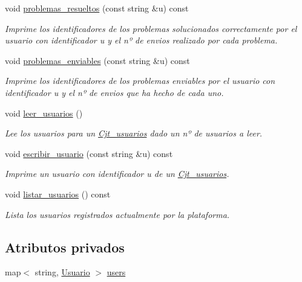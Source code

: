 \begin{DoxyCompactItemize}
void \mbox{\hyperlink{class_cjt__usuarios_a08ce8035512646dec31f4959dc8aa891}{problemas\+\_\+resueltos}} (const string \&u) const
\begin{DoxyCompactList}\small\item\em Imprime los identificadores de los problemas solucionados correctamente por el usuario con identificador u y el nº de envios realizado por cada problema. \end{DoxyCompactList}\item 
void \mbox{\hyperlink{class_cjt__usuarios_a60b4396cdd65a2aa4b7a8706dabbe08b}{problemas\+\_\+enviables}} (const string \&u) const
\begin{DoxyCompactList}\small\item\em Imprime los identificadores de los problemas enviables por el usuario con identificador u y el nº de envios que ha hecho de cada uno. \end{DoxyCompactList}\item 
void \mbox{\hyperlink{class_cjt__usuarios_aeb27ae7d46e9b78e2d477df74461bc68}{leer\+\_\+usuarios}} ()
\begin{DoxyCompactList}\small\item\em Lee los usuarios para un \mbox{\hyperlink{class_cjt__usuarios}{Cjt\+\_\+usuarios}} dado un nº de usuarios a leer. \end{DoxyCompactList}\item 
void \mbox{\hyperlink{class_cjt__usuarios_abf4abc6a1349c504bd0628cfe665df39}{escribir\+\_\+usuario}} (const string \&u) const
\begin{DoxyCompactList}\small\item\em Imprime un usuario con identificador u de un \mbox{\hyperlink{class_cjt__usuarios}{Cjt\+\_\+usuarios}}. \end{DoxyCompactList}\item 
void \mbox{\hyperlink{class_cjt__usuarios_adb9a7441da7fb87a524142aaf6e61853}{listar\+\_\+usuarios}} () const
\begin{DoxyCompactList}\small\item\em Lista los usuarios registrados actualmente por la plataforma. \end{DoxyCompactList}\end{DoxyCompactItemize}
\subsection*{Atributos privados}
\begin{DoxyCompactItemize}
\item 
map$<$ string, \mbox{\hyperlink{class_usuario}{Usuario}} $>$ \mbox{\hyperlink{class_cjt__usuarios_a0b702ca0184d6fb2674cc827d39d5bff}{users}}
\end{DoxyCompactItemize}


